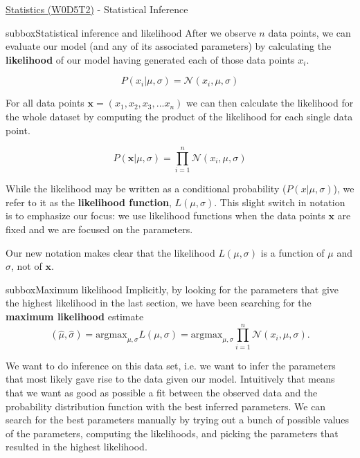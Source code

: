 \begin{multicols}{3}
\begin{textbox}{\href{https://compneuro.neuromatch.io/tutorials/W0D5_Statistics/student/W0D5_Tutorial2.html}{Statistics (W0D5T2)} - Statistical Inference}
\begin{subbox}{subbox}{Statistical inference and likelihood}
After we observe $n$ data points, we can evaluate our model (and any of its associated parameters) by calculating the \textbf{likelihood} of our model having generated each of those data points $x_i$.

\begin{equation}
P(x_i|\mu,\sigma)=\mathcal{N}(x_i,\mu,\sigma)
\end{equation}

For all data points $\mathbf{x}=(x_1, x_2, x_3, ...x_n) $ we can then calculate the likelihood for the whole dataset by computing the product of the likelihood for each single data point.

\begin{equation}
P(\mathbf{x}|\mu,\sigma)=\prod_{i=1}^n \mathcal{N}(x_i,\mu,\sigma)
\end{equation}

While the likelihood may be written as a conditional probability ($P(x|\mu,\sigma)$), we refer to it as the \textbf{likelihood function}, $L(\mu,\sigma)$.  This slight switch in notation is to emphasize our focus: we use likelihood functions when the data points $\mathbf{x}$ are fixed and we are focused on the parameters.

Our new notation makes clear that the likelihood $L(\mu,\sigma)$ is a function of $\mu$ and $\sigma$, not of $\mathbf{x}$.


\end{subbox}
\begin{subbox}{subbox}{Maximum likelihood}
\scriptsize
Implicitly, by looking for the parameters that give the highest likelihood in the last section, we have been searching for the \textbf{maximum likelihood} estimate
\begin{equation}
(\hat{\mu},\hat{\sigma}) = \text{argmax}_{\mu,\sigma}L(\mu,\sigma) = \text{argmax}_{\mu,\sigma} \prod_{i=1}^n \mathcal{N}(x_i,\mu,\sigma).
\end{equation}

We want to do inference on this data set, i.e. we want to infer the parameters that most likely gave rise to the data given our model. Intuitively that means that we want as good as possible a fit between the observed data and the probability distribution function with the best inferred parameters. We can search for the best parameters manually by trying out a bunch of possible values of the parameters, computing the likelihoods, and picking the parameters that resulted in the highest likelihood. 


\end{subbox}
\end{textbox}
\end{multicols}
